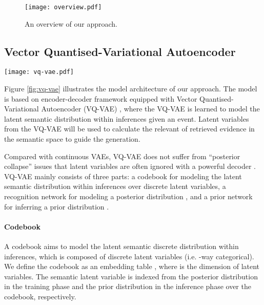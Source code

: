 \documentclass[11pt,a4paper]{article}
\begin{document}
\begin{figure}[t]
	\centering
	\texttt{[image: overview.pdf]}
	\caption{An overview of our approach.}
	\label{fig:model}
\end{figure}










\subsection{Vector Quantised-Variational Autoencoder}
\begin{figure*}[t]
	\centering
	\texttt{[image: vq-vae.pdf]}
	\caption{The model architecture of our approach. }
	\label{fig:vq-vae}
\end{figure*}

Figure \ref{fig:vq-vae} illustrates the model architecture of our approach. The model is based on encoder-decoder framework equipped with Vector Quantised-Variational Autoencoder (VQ-VAE) \cite{van2017neural}, where the VQ-VAE is learned to model the latent semantic distribution within inferences given an event. Latent variables  from the VQ-VAE will be used to calculate the \mbox{relevant} of retrieved evidence in the semantic space to guide the generation.



Compared with continuous VAEs, VQ-VAE does not suffer from ``posterior collapse'' issues that latent variables are often ignored with a powerful decoder \cite{van2017neural}.
VQ-VAE mainly consists of three parts: a codebook for modeling the latent semantic distribution within inferences over discrete latent variables, a recognition network for modeling a posterior distribution , and a prior network for inferring a prior distribution . 


\paragraph{Codebook}
A codebook aims to model the \mbox{latent} semantic discrete distribution within inferences, which is composed of  discrete latent variables (i.e. -way  categorical). We define the codebook as an embedding table , where  is the dimension of latent variables. The semantic latent variable  is indexed from the posterior distribution  in the training phase and the prior distribution  in the inference phase over the codebook, respectively. 
\end{document}

